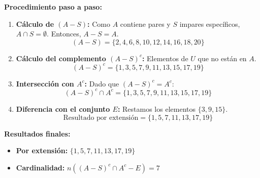 \documentclass[12pt]{article}
\begin{document}
	\textbf{Procedimiento paso a paso:}
	\begin{enumerate}
		\item \textbf{Cálculo de $(A - S)$:} Como $A$ contiene pares y $S$ impares específicos, $A \cap S = \emptyset$. Entonces, $A - S = A$.
		\[ (A - S) = \{2, 4, 6, 8, 10, 12, 14, 16, 18, 20\} \]
		
		\item \textbf{Cálculo del complemento $(A - S)^c$:} Elementos de $U$ que no están en $A$.
		\[ (A - S)^c = \{1, 3, 5, 7, 9, 11, 13, 15, 17, 19\} \]
		
		\item \textbf{Intersección con $A^c$:} Dado que $(A - S)^c = A^c$:
		\[ (A - S)^c \cap A^c = \{1, 3, 5, 7, 9, 11, 13, 15, 17, 19\} \]
		
		\item \textbf{Diferencia con el conjunto $E$:} Restamos los elementos $\{3, 9, 15\}$.
		\[ \text{Resultado por extensión} = \{1, 5, 7, 11, 13, 17, 19\} \]
	\end{enumerate}
	
	\textbf{Resultados finales:}
	\begin{itemize}
		\item \textbf{Por extensión:} $\{1, 5, 7, 11, 13, 17, 19\}$
		\item \textbf{Cardinalidad:} $n((A - S)^c \cap A^c - E) = 7$
	\end{itemize}
	
\end{document}
